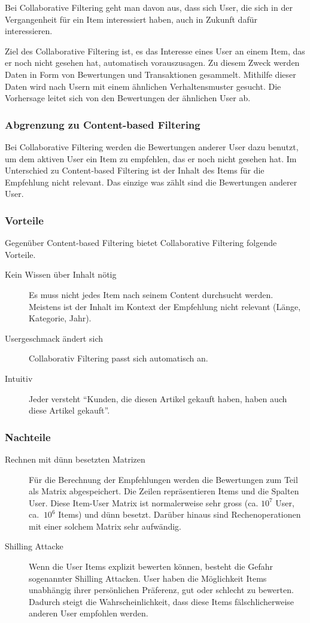 \documentclass[a4paper, 12pt]{article}
\begin{document}
Bei Collaborative Filtering geht man davon aus, dass sich User, die sich in der Vergangenheit für ein Item interessiert haben, auch in Zukunft dafür interessieren. 

Ziel des Collaborative Filtering ist, es das Interesse eines User an einem Item, das er noch nicht gesehen hat, automatisch vorauszusagen. Zu diesem Zweck werden Daten in Form von Bewertungen und Transaktionen gesammelt. Mithilfe dieser Daten wird nach Usern mit einem ähnlichen Verhaltensmuster gesucht. Die Vorhersage leitet sich von den Bewertungen der ähnlichen User ab. 

\subsubsection{Abgrenzung zu Content-based Filtering}
\label{sec:definitioncf}

Bei Collaborative Filtering werden die Bewertungen anderer User dazu benutzt, um dem aktiven User ein Item zu empfehlen, das er noch nicht gesehen hat. Im Unterschied zu Content-based Filtering ist der Inhalt des Items für die Empfehlung nicht relevant. Das einzige was zählt sind die Bewertungen anderer User.

\subsubsection{Vorteile}
\label{sec:advandage}
Gegenüber Content-based Filtering bietet Collaborative Filtering folgende Vorteile.

\begin{description}
\item[Kein Wissen über Inhalt nötig] Es muss nicht jedes Item nach seinem Content durchsucht werden. Meistens ist der Inhalt im Kontext der Empfehlung nicht relevant (Länge, Kategorie, Jahr).
\item[Usergeschmack ändert sich] Collaborativ Filtering passt sich automatisch an.
\item[Intuitiv] Jeder versteht "`Kunden, die diesen Artikel gekauft haben, haben auch diese Artikel gekauft"'.
\end{description}

\subsubsection{Nachteile}
 \begin{description}
\item[Rechnen mit dünn besetzten Matrizen] Für die Berechnung der Empfehlungen werden die Bewertungen zum Teil als Matrix abgespeichert. Die Zeilen repräsentieren Items und die Spalten User. Diese Item-User Matrix ist normalerweise sehr gross (ca. $10^{7}$ User, ca. $~10^6$ Items) und dünn besetzt. Darüber hinaus sind Rechenoperationen mit einer solchem Matrix sehr aufwändig.  
\item[Shilling Attacke] Wenn die User Items explizit bewerten können, besteht die Gefahr sogenannter Shilling Attacken. User haben die Möglichkeit Items unabhängig ihrer persönlichen Präferenz, gut oder schlecht zu bewerten. Dadurch steigt die Wahrscheinlichkeit, dass diese Items fälschlicherweise anderen User empfohlen werden.
\end{description}
\end{document}
